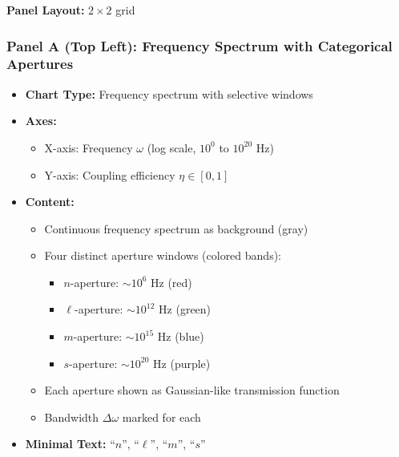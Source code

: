 \textbf{Panel Layout:} $2 \times 2$ grid

\subsubsection*{Panel A (Top Left): Frequency Spectrum with Categorical Apertures}
\begin{itemize}
\item \textbf{Chart Type:} Frequency spectrum with selective windows
\item \textbf{Axes:}
  \begin{itemize}
  \item X-axis: Frequency $\omega$ (log scale, $10^0$ to $10^{20}$ Hz)
  \item Y-axis: Coupling efficiency $\eta \in [0,1]$
  \end{itemize}
\item \textbf{Content:}
  \begin{itemize}
  \item Continuous frequency spectrum as background (gray)
  \item Four distinct aperture windows (colored bands):
    \begin{itemize}
    \item $n$-aperture: $\sim 10^6$ Hz (red)
    \item $\ell$-aperture: $\sim 10^{12}$ Hz (green)
    \item $m$-aperture: $\sim 10^{15}$ Hz (blue)
    \item $s$-aperture: $\sim 10^{20}$ Hz (purple)
    \end{itemize}
  \item Each aperture shown as Gaussian-like transmission function
  \item Bandwidth $\Delta\omega$ marked for each
  \end{itemize}
\item \textbf{Minimal Text:} ``$n$'', ``$\ell$'', ``$m$'', ``$s$''
\end{itemize}

